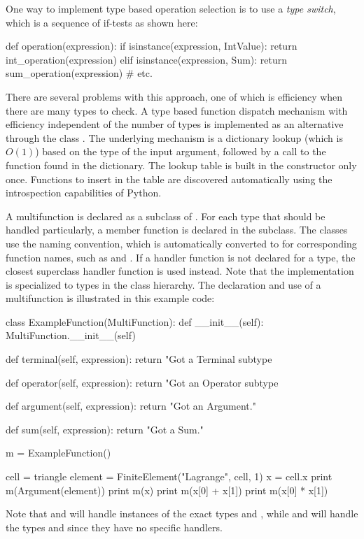 One way to implement type based operation selection is to use a
\emph{type switch}, which is a sequence of if-tests as shown here:
\begin{python}
def operation(expression):
    if isinstance(expression, IntValue):
        return int_operation(expression)
    elif isinstance(expression, Sum):
        return sum_operation(expression)
    # etc.
\end{python}
There are several problems with this approach, one of which is
efficiency when there are many types to check.  A type based function
dispatch mechanism with efficiency independent of the number of types
is implemented as an alternative through the class .
The underlying mechanism is a dictionary lookup (which is $O(1)$) based on
the type of the input argument, followed by a call to the function found
in the dictionary. The lookup table is built in the 
constructor only once.  Functions to insert in the table are discovered
automatically using the introspection capabilities of Python.

A multifunction is declared as a subclass of . For each
type that should be handled particularly, a member function is declared
in the subclass.  The  classes use the  naming
convention, which is automatically converted to 
for corresponding function names, such as  and
.  If a handler function is not declared for a type,
the closest superclass handler function is used instead.  Note that
the  implementation is specialized to types in the
 class hierarchy.  The declaration and use of a multifunction
is illustrated in this example code:
\begin{python}
class ExampleFunction(MultiFunction):
    def __init__(self):
        MultiFunction.__init__(self)

    def terminal(self, expression):
        return "Got a Terminal subtype %

    def operator(self, expression):
        return "Got an Operator subtype %

    def argument(self, expression):
        return "Got an Argument."

    def sum(self, expression):
        return "Got a Sum."

m = ExampleFunction()

cell = triangle
element = FiniteElement("Lagrange", cell, 1)
x = cell.x
print m(Argument(element))
print m(x)
print m(x[0] + x[1])
print m(x[0] * x[1])
\end{python}
Note that  and  will handle instances of the exact types
 and , while  and 
will handle the types  and  since
they have no specific handlers.


